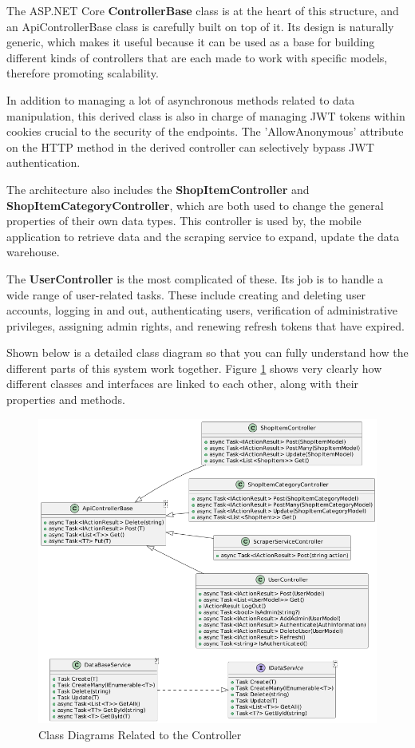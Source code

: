 The ASP.NET Core \textbf{ControllerBase} class is at the heart of this structure, and an ApiControllerBase class is carefully built on top of it. Its design is naturally generic, which makes it useful because it can be used as a base for building different kinds of controllers that are each made to work with specific models, therefore promoting scalability.

In addition to managing a lot of asynchronous methods related to data manipulation, this derived class is also in charge of managing JWT tokens within cookies crucial to the security of the endpoints. The 'AllowAnonymous' attribute on the HTTP method in the derived controller can selectively bypass JWT authentication.

The architecture also includes the \textbf{ShopItemController} and \textbf{ShopItemCategoryController}, which are both used to change the general properties of their own data types. This controller is used by, the mobile application to retrieve data and the scraping service to expand, update the data warehouse.

The \textbf{UserController} is the most complicated of these. Its job is to handle a wide range of user-related tasks. These include creating and deleting user accounts, logging in and out, authenticating users, verification of administrative privileges, assigning admin rights, and renewing refresh tokens that have expired.

Shown below is a detailed class diagram so that you can fully understand how the different parts of this system work together. Figure \ref{fig:ccd} shows very clearly how different classes and interfaces are linked to each other, along with their properties and methods.

\begin{figure}[H]
	\centering
	\includegraphics[width=1\linewidth]{img/controller_classdiagram.png}
	\caption{Class Diagrams Related to the Controller}
	\label{fig:ccd}
\end{figure}

